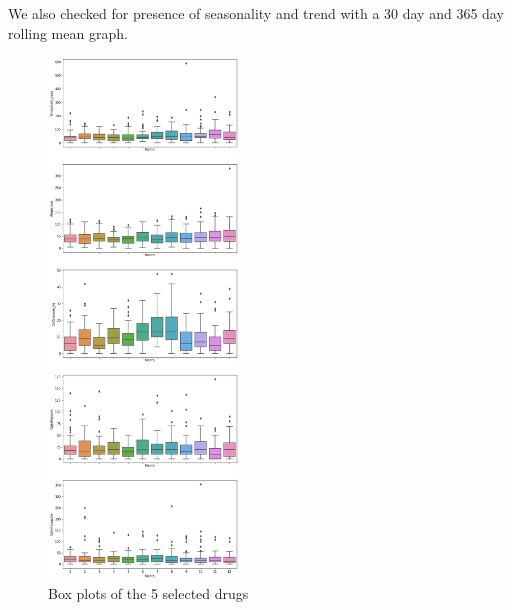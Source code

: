 \documentclass[12pt]{report}
\begin{document}
 We also checked for presence of seasonality and trend with a 30 day and 365 day rolling mean graph. 


\begin{figure}[H]%
  \begin {center}
  \includegraphics[width=0.45\textwidth]{images/download.png}
  \caption{Box plots of the 5 selected drugs}
  \label{fig:ecg}
  \end {center}
\end{figure}
\end{document}
